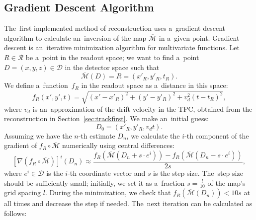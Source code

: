			
		
		\subsection{Gradient Descent Algorithm}
		\label{sec:grad}			
			The~first implemented method of reconstruction uses a~gradient descent algorithm to calculate an~inversion of the map $\overline{\mathcal{M}}$ in a~given point. Gradient descent is an~iterative minimization algorithm for multivariate functions. Let $R\in\mathcal{R}$ be a~point in the readout space; we want to find a~point $D = (x,y,z) \in\mathcal{D}$ in the detector space such that 
				\begin{equation}
					\overline{\mathcal{M}}(D) = R = (x'_R,y'_R,t_R).
				\end{equation}
			We define a~function~$f_R$ in the readout space as a~distance in this space:
				\begin{equation}
					f_R(x',y',t) = \sqrt{(x'-x'_R)^2+(y'-y'_R)^2+v_d^2(t-t_R)^2},
				\end{equation}
			where $v_d$ is an~approximation of the drift velocity in the \ac{TPC}, obtained from the reconstruction in Section~\ref{sec:trackfirst}. We make an~initial guess:
				\begin{equation}
					D_0 = (x'_R,y'_R,v_dt).
				\end{equation}
			Assuming we have the $n$-th estimate $D_n$, we calculate the $i$-th component of the gradient of $f_R\circ\overline{\mathcal{M}}$ numerically using central differences:
				\begin{equation}
					\left[\nabla(f_R\circ\overline{\mathcal{M}})\right]^i(D_n) \approx \frac{f_R(\overline{\mathcal{M}}(D_n+s\cdot e^i))-f_R(\overline{\mathcal{M}}(D_n-s\cdot e^i))}{2s},
				\end{equation}
			where $e^i\in\mathcal{D}$ is the $i$-th coordinate vector and $s$ is the step size. The~step size should be sufficiently small; initially, we set it as a~fraction $s = \frac{l}{10}$ of the map's grid spacing $l$. During the minimization, we check that $f_R(\overline{\mathcal{M}}(D_n))<10s$ at all times and decrease the step if needed. The~next iteration can be calculated as follows:
